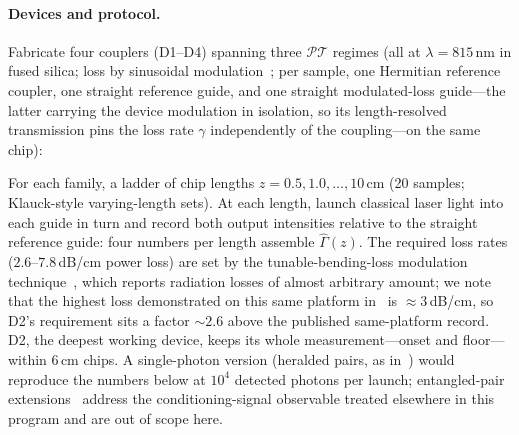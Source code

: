 \documentclass[11pt]{article}
\newcommand{\PT}{\mathcal{PT}}
\begin{document}
\paragraph{Devices and protocol.} Fabricate four couplers (D1--D4) spanning three $\PT$ regimes
(all at $\lambda=815\,$nm in fused silica; loss by sinusoidal
modulation~\cite{Eichelkraut2014}; per sample, one Hermitian reference
coupler, one straight reference guide, and one straight modulated-loss
guide---the latter carrying the device modulation in isolation, so its
length-resolved transmission pins the loss rate $\gamma$ independently
of the coupling---on the same chip):

\begin{center}\small
{}
\end{center}

\noindent For each family, a ladder of chip lengths
$z=0.5,1.0,\dots,10\,$cm (20 samples; Klauck-style
varying-length sets). At each length, launch classical laser light
into each guide in turn and record both output intensities relative
to the straight reference guide: four numbers per length assemble
$\hat\Gamma(z)$. The required loss rates ($2.6$--$7.8\,$dB/cm power
loss) are set by the tunable-bending-loss modulation
technique~\cite{Eichelkraut2014}, which reports radiation losses of
almost arbitrary amount; we note that the highest loss demonstrated on
this same platform in~\cite{Klauck2019} is ${\approx}3\,$dB/cm, so D2's
requirement sits a factor ${\sim}2.6$ above the published
same-platform record. D2, the deepest working device,
keeps its whole measurement---onset and floor---within $6\,$cm chips. A single-photon version
(heralded pairs, as in~\cite{Klauck2019}) would reproduce the numbers
below at $10^4$ detected photons per launch; entangled-pair
extensions~\cite{Tang2016,Ehrhardt2022} address the
conditioning-signal observable treated elsewhere in this program and
are out of scope here.
\end{document}
